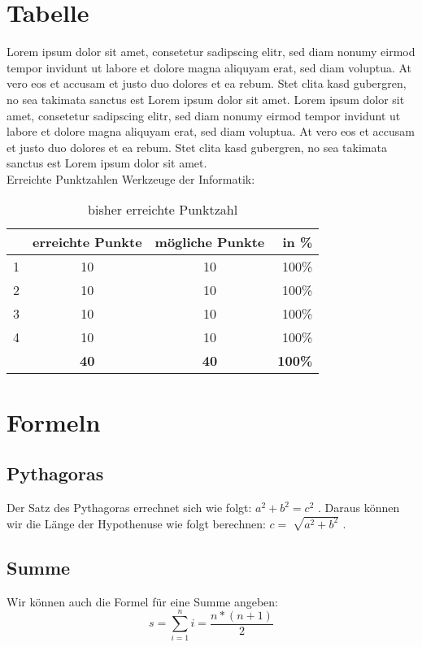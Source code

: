 \documentclass[11pt]{article}
\begin{document}
\section{Tabelle}
Lorem ipsum dolor sit amet, consetetur sadipscing elitr, sed diam nonumy eirmod tempor invidunt ut labore et dolore magna aliquyam erat, sed diam voluptua. At vero eos et accusam et justo duo dolores et ea rebum. Stet clita kasd gubergren, no sea takimata sanctus est Lorem ipsum dolor sit amet. Lorem ipsum dolor sit amet, consetetur sadipscing elitr, sed diam nonumy eirmod tempor invidunt ut labore et dolore magna aliquyam erat, sed diam voluptua. At vero eos et accusam et justo duo dolores et ea rebum. Stet clita kasd gubergren, no sea takimata sanctus est Lorem ipsum dolor sit amet.\\

\noindent Erreichte Punktzahlen Werkzeuge der Informatik:

\begin{table}[!th]

\begin{tabular}{r|c|c|r}

& \textbf{erreichte Punkte} & \textbf{mögliche Punkte} & \textbf{in \%} \\
\hline
1 & 10 & 10 & 100\% \\
2 & 10 & 10 & 100\% \\
3 & 10 & 10 & 100\% \\
4 & 10 & 10 & 100\% \\
\hline
& \textbf{40} & \textbf{40} & \textbf{100\%} \\

\end{tabular}
\caption{bisher erreichte Punktzahl}
\end{table}


\section{Formeln}

\subsection{Pythagoras}
Der Satz des Pythagoras errechnet sich wie folgt: $a^{2} + b^{2} = c^{2}$ .
Daraus können wir die Länge der Hypothenuse wie folgt berechnen: $c = \sqrt[]{a^{2} + b^{2}}$ . 

\subsection{Summe}
Wir können auch die Formel für eine Summe angeben:
\begin{equation} 
s = \sum_{i=1}^n i = \frac{n * (n + 1)}{2}
\end{equation}
\end{document}
